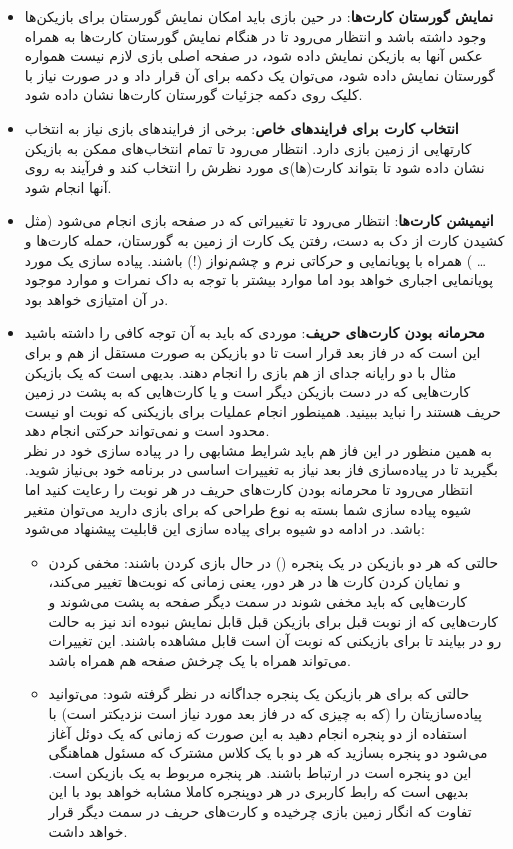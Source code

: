 \documentclass[]{article}
\begin{document}
\begin{itemize}
    \item \textbf{نمایش گورستان کارت‌ها}: در حین بازی باید امکان نمایش گورستان برای بازیکن‌ها وجود داشته باشد و انتظار می‌رود تا در هنگام نمایش گورستان کارت‌ها به همراه عکس آنها به بازیکن نمایش داده شود، در صفحه اصلی بازی لازم نیست همواره گورستان نمایش داده شود، می‌توان یک دکمه برای آن قرار داد و در صورت نیاز با کلیک روی دکمه جزئیات گورستان کارت‌ها نشان داده شود.
    \item \textbf{انتخاب کارت برای فرایندهای خاص}: برخی از فرایندهای بازی نیاز به انتخاب کارتهایی از زمین بازی دارد. انتظار می‌رود تا تمام انتخاب‌های ممکن به بازیکن نشان داده شود تا بتواند کارت(ها)ی مورد نظرش را انتخاب کند و فرآیند به روی آنها انجام شود.
    \item \textbf{انیمیشن کارت‌ها}: انتظار می‌رود تا تغییراتی که در صفحه بازی انجام می‌شود (مثل کشیدن کارت از دک به دست، رفتن یک کارت از زمین به گورستان، حمله کارت‌ها و … ) همراه با پویانمایی و حرکاتی نرم و چشم‌نواز (!) باشند. پیاده سازی یک مورد پویانمایی اجباری خواهد بود اما موارد بیشتر با توجه به داک نمرات و موارد موجود در آن امتیازی خواهد بود.
    \item \textbf{محرمانه بودن کارت‌های حریف}: موردی که باید به آن توجه کافی را داشته باشید این است که در فاز بعد قرار است تا دو بازیکن به صورت مستقل از هم و برای مثال با دو رایانه جدای از هم بازی را انجام دهند. بدیهی است که یک بازیکن کارت‌هایی که در دست بازیکن دیگر است و یا کارت‌هایی که به پشت در زمین حریف‌ هستند را نباید ببینید. همینطور انجام عملیات برای بازیکنی که نوبت او نیست محدود است و نمی‌تواند حرکتی انجام دهد. \\
    به همین منظور در این فاز هم باید شرایط مشابهی را در پیاده سازی خود در نظر بگیرید تا در پیاده‌سازی فاز بعد نیاز به تغییرات اساسی در برنامه خود بی‌نیاز شوید. انتظار می‌رود تا محرمانه بودن کارت‌های حریف در هر نوبت را رعایت کنید اما شیوه  پیاده سازی شما بسته به نوع طراحی که برای بازی دارید می‌توان متغیر باشد. در ادامه دو شیوه برای پیاده سازی این قابلیت پیشنهاد می‌شود:
    \begin{itemize}
        \item حالتی که هر دو بازیکن در یک پنجره () در حال بازی کردن باشند:‌ مخفی کردن و نمایان کردن کارت ها در هر دور، یعنی زمانی که نوبت‌ها تغییر می‌کند، کارت‌هایی که باید مخفی شوند در سمت دیگر صفحه به پشت می‌شوند و کارت‌هایی که از نوبت قبل برای بازیکن قبل قابل نمایش نبوده اند نیز به حالت رو در بیایند تا برای بازیکنی که نوبت آن است قابل مشاهده باشند. این تغییرات می‌تواند همراه با یک چرخش صفحه هم همراه باشد.
        \item حالتی که برای هر بازیکن یک پنجره جداگانه در نظر گرفته شود: می‌توانید پیاده‌سازیتان را (که به چیزی که در فاز بعد مورد نیاز است نزدیکتر است) با استفاده از دو پنجره انجام دهید به این صورت که زمانی که یک دوئل آغاز می‌شود دو پنجره بسازید که هر دو با یک کلاس مشترک که مسئول هماهنگی این دو پنجره است در ارتباط باشند. هر پنجره مربوط به یک بازیکن است. بدیهی است که رابط کاربری در هر دوپنجره کاملا مشابه خواهد بود با این تفاوت که انگار زمین بازی چرخیده و کارت‌های حریف در سمت دیگر قرار خواهد داشت. 

\end{itemize}
\end{itemize}
\end{document}

